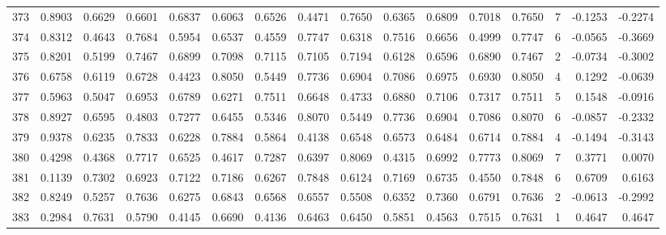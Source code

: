 \begin{tabular}{lrrrrrrrrrrrrrrr}
373 &      0.8903 &  0.6629 &  0.6601 &  0.6837 &  0.6063 &  0.6526 &  0.4471 &  0.7650 &  0.6365 &  0.6809 &   0.7018 &     0.7650 &      7 &                   -0.1253 &                    -0.2274 \\
374 &      0.8312 &  0.4643 &  0.7684 &  0.5954 &  0.6537 &  0.4559 &  0.7747 &  0.6318 &  0.7516 &  0.6656 &   0.4999 &     0.7747 &      6 &                   -0.0565 &                    -0.3669 \\
375 &      0.8201 &  0.5199 &  0.7467 &  0.6899 &  0.7098 &  0.7115 &  0.7105 &  0.7194 &  0.6128 &  0.6596 &   0.6890 &     0.7467 &      2 &                   -0.0734 &                    -0.3002 \\
376 &      0.6758 &  0.6119 &  0.6728 &  0.4423 &  0.8050 &  0.5449 &  0.7736 &  0.6904 &  0.7086 &  0.6975 &   0.6930 &     0.8050 &      4 &                    0.1292 &                    -0.0639 \\
377 &      0.5963 &  0.5047 &  0.6953 &  0.6789 &  0.6271 &  0.7511 &  0.6648 &  0.4733 &  0.6880 &  0.7106 &   0.7317 &     0.7511 &      5 &                    0.1548 &                    -0.0916 \\
378 &      0.8927 &  0.6595 &  0.4803 &  0.7277 &  0.6455 &  0.5346 &  0.8070 &  0.5449 &  0.7736 &  0.6904 &   0.7086 &     0.8070 &      6 &                   -0.0857 &                    -0.2332 \\
379 &      0.9378 &  0.6235 &  0.7833 &  0.6228 &  0.7884 &  0.5864 &  0.4138 &  0.6548 &  0.6573 &  0.6484 &   0.6714 &     0.7884 &      4 &                   -0.1494 &                    -0.3143 \\
380 &      0.4298 &  0.4368 &  0.7717 &  0.6525 &  0.4617 &  0.7287 &  0.6397 &  0.8069 &  0.4315 &  0.6992 &   0.7773 &     0.8069 &      7 &                    0.3771 &                     0.0070 \\
381 &      0.1139 &  0.7302 &  0.6923 &  0.7122 &  0.7186 &  0.6267 &  0.7848 &  0.6124 &  0.7169 &  0.6735 &   0.4550 &     0.7848 &      6 &                    0.6709 &                     0.6163 \\
382 &      0.8249 &  0.5257 &  0.7636 &  0.6275 &  0.6843 &  0.6568 &  0.6557 &  0.5508 &  0.6352 &  0.7360 &   0.6791 &     0.7636 &      2 &                   -0.0613 &                    -0.2992 \\
383 &      0.2984 &  0.7631 &  0.5790 &  0.4145 &  0.6690 &  0.4136 &  0.6463 &  0.6450 &  0.5851 &  0.4563 &   0.7515 &     0.7631 &      1 &                    0.4647 &                     0.4647 \\

\end{tabular}
